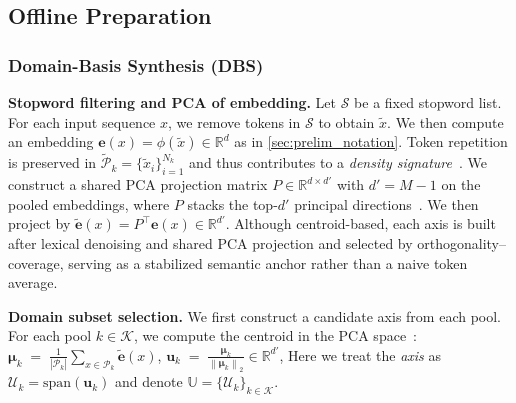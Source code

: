 \subsection{Offline Preparation}
\label{sec:method_offline}
\vspace{-2pt}

\subsubsection{Domain-Basis Synthesis (DBS)}
\label{sec:method_dbc}
\vspace{-1mm}


\textbf{Stopword filtering and PCA of embedding.}
Let $\mathcal{S}$ be a fixed stopword list.
For each input sequence $x$, we remove tokens in $\mathcal{S}$ to obtain $\tilde{x}$.
We then compute an embedding $\mathbf{e}(x)=\phi(\tilde{x})\in\mathbb{R}^d$ as in \cref{sec:prelim_notation}. Token repetition is preserved in $\mathcal{\tilde{P}}_k=\{\tilde{x}_i\}_{i=1}^{N_k}$ and thus contributes to a \emph{density signature}~\cite{manning2008ir}. We construct a shared PCA projection matrix $P\in\mathbb{R}^{d\times d'}$ with $d' = M-1$ on the pooled embeddings, where $P$ stacks the top-$d'$ principal directions~\cite{jolliffe2002pca}.
We then project by $\tilde{\mathbf e}(x)=P^\top \mathbf e(x)\in\mathbb{R}^{d'}$.
Although centroid-based, each axis is built after lexical denoising and shared PCA projection and selected by orthogonality--coverage, serving as a stabilized semantic anchor rather than a naive token average.

\textbf{Domain subset selection.}
We first construct a candidate axis from each pool.
For each pool $k\in\mathcal{K}$, we compute the centroid in the PCA space~\cite{rocchio1971relevance}: $\boldsymbol{\mu}_k \;=\; \frac{1}{\left|\mathcal{P}_k\right|}\sum_{x\in\mathcal{P}_k} \tilde{\mathbf e}(x)$, $\mathbf{u}_k \;=\; \frac{\boldsymbol{\mu}_k}{\left\|\boldsymbol{\mu}_k\right\|_2}\in\mathbb{R}^{d'}$,
Here we treat the \emph{axis} as $\mathcal{U}_k=\mathrm{span}(\mathbf{u}_k)$ and denote $\mathbb{U}=\{\mathcal{U}_k\}_{k\in\mathcal{K}}$.

